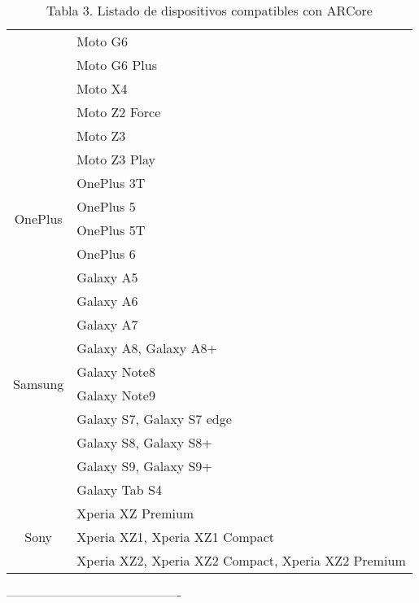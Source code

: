 \begin{table}[]
\begin{tabular}{|c|l|}
		& Moto G6                                            \\ \cline{2-2} 
		& Moto G6 Plus                                       \\ \cline{2-2} 
		& Moto X4                                            \\ \cline{2-2} 
		& Moto Z2 Force                                      \\ \cline{2-2} 
		& Moto Z3                                            \\ \cline{2-2} 
		& Moto Z3 Play                                       \\ \hline
		\multirow{4}{*}{OnePlus}    & OnePlus 3T                                         \\ \cline{2-2} 
		& OnePlus 5                                          \\ \cline{2-2} 
		& OnePlus 5T                                         \\ \cline{2-2} 
		& OnePlus 6                                          \\ \hline
		\multirow{10}{*}{Samsung}   & Galaxy A5                                          \\ \cline{2-2} 
		& Galaxy A6                                          \\ \cline{2-2} 
		& Galaxy A7                                          \\ \cline{2-2} 
		& Galaxy A8, Galaxy A8+                              \\ \cline{2-2} 
		& Galaxy Note8                                       \\ \cline{2-2} 
		& Galaxy Note9                                       \\ \cline{2-2} 
		& Galaxy S7, Galaxy S7 edge                          \\ \cline{2-2} 
		& Galaxy S8, Galaxy S8+                              \\ \cline{2-2} 
		& Galaxy S9, Galaxy S9+                              \\ \cline{2-2} 
		& Galaxy Tab S4                                      \\ \hline
		\multirow{3}{*}{Sony}       & Xperia XZ Premium                                  \\ \cline{2-2} 
		& Xperia XZ1, Xperia XZ1 Compact                     \\ \cline{2-2} 
		& Xperia XZ2, Xperia XZ2 Compact, Xperia XZ2 Premium \\ \hline
	\end{tabular}

\captionsetup{justification=centering}
\caption*{Tabla 3. Listado de dispositivos compatibles con ARCore}
\end{table}


----------------------------------------------